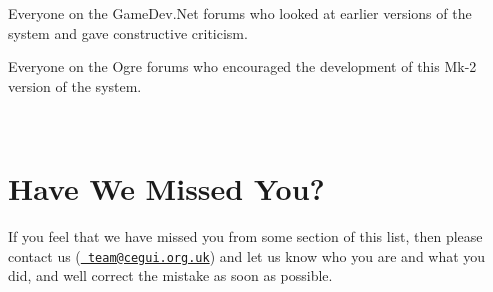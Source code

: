 Everyone on the Game\+Dev.\+Net forums who looked at earlier versions of the system and gave constructive criticism.

Everyone on the Ogre forums who encouraged the development of this Mk-\/2 version of the system.

~\newline
 \hypertarget{authors_authors_sec_7}{}\section{Have We Missed You?}\label{authors_authors_sec_7}
If you feel that we have missed you from some section of this list, then please contact us (\href{mailto:team@cegui.org.uk}{\texttt{ team@cegui.\+org.\+uk}}) and let us know who you are and what you did, and we\textquotesingle{}ll correct the mistake as soon as possible. 
